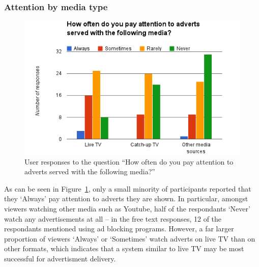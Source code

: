 \subsubsection{Attention by media type}
\label{sec:prestudy_media}
\begin{figure}[H]
	\vspace{-10pt}
	\includegraphics[width=\textwidth, clip=true, trim=0 0 0 55pt]{images/prestudy_media.png}
	\caption{User responses to the question ``How often do you pay attention to adverts served with the following media?''}
	\label{fig:prestudy_media}
	\vspace{-15pt}
\end{figure}
As can be seen in Figure~\ref{fig:prestudy_media}, only a small minority of participants reported that they `Always' pay attention to adverts they are shown. In particular, amongst viewers watching other media such as Youtube, half of the respondants `Never' watch any advertisements at all -- in the free text responses, 12 of the respondants mentioned using ad blocking programs. However, a far larger proportion of viewers `Always' or `Sometimes' watch adverts on live TV than on other formats, which indicates that a system similar to live TV may be most successful for advertisment delivery.

